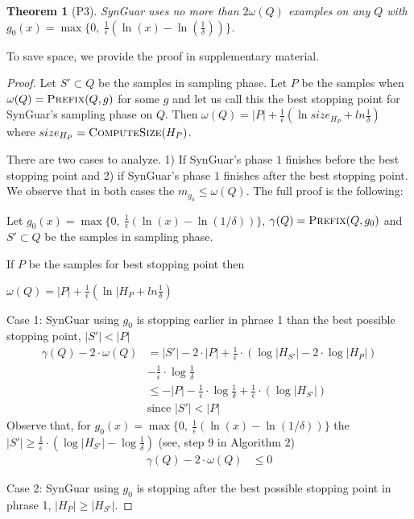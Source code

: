 \documentclass[11pt]{extarticle}
\newtheorem{theorem}{Theorem}[section]
\newcommand{\tool}{{\sc SynGuar}\xspace}
\newcommand{\parf}{g}
\begin{document}
\begin{theorem}[P3]
\label{thm:p3}
    \tool uses no more than $2\omega(Q)$ examples on any $Q$ with $\parf_{0}(x)=\max\{0, ~\frac{1}{\epsilon}(\ln(x)-\ln(\frac{1}{\delta}))\}$.
\end{theorem}
To save space, we provide the proof in supplementary material.
\begin{proof}
Let $S'\subset Q$ be the samples in sampling phase. Let $P$ be the samples when $\omega(Q)=\Call{Prefix}{Q,g}$ for some $g$ and let us call this the best stopping point for \tool's sampling phase on $Q$. Then $\omega(Q)=|P|+\frac{1}{\epsilon}(\ln{size_{H_{P}}} + ln{\frac{1}{\delta}})$ where $size_{H_{P}}= \Call{ComputeSize}{H_{P}}$.

There are two cases to analyze. 1) If \tool's phase $1$ finishes before the best stopping point and 2) if \tool's phase $1$ finishes after the best stopping point. We observe that in both cases the $m_{g_0}\le\omega(Q)$. 
The full proof is the following:

Let $\parf_0(x)=\max\{0, ~\frac{1}{\epsilon}(\ln(x)-\ln(1/\delta))\}$, $\gamma(Q) = \Call{Prefix}{Q,\parf_0}$ and $S'\subset Q$ be the samples in sampling phase.

If $P$ be the samples for best stopping point then

$\omega(Q)=|P|+\frac{1}{\epsilon}(\ln{|H_P} + ln{\frac{1}{\delta}})$

\noindent Case 1: \tool using $\parf_0$ is stopping earlier in phrase 1 than the best possible stopping point, $|S'| < |P|$
\begin{align*}
    \gamma(Q) - 2\cdot\omega(Q) &= |S'|- 2\cdot|P| +  \frac{1}{\epsilon}\cdot(\log{|H_{S'}|} - 2\cdot \log{|H_{P}|})\\ 
    &- \frac{1}{\epsilon}\cdot\log{\frac{1}{\delta}}\\
    & \leq -|P| - \frac{1}{\epsilon}\cdot\log{\frac{1}{\delta}} + \frac{1}{\epsilon}\cdot(\log{|H_{S'}|})\\
    &\text{since }|S'| < |P|
\end{align*}
Observe that, for $\parf_0(x)=\max\{0, ~\frac{1}{\epsilon}(\ln(x)-\ln(1/\delta))\} $ the 
$|S'| \geq \frac{1}{\epsilon}\cdot(\log{|H_{S'}|}-\log{\frac{1}{\delta}})$ (see, step $9$ in Algorithm $2$)
\begin{align*}
    \gamma(Q) - 2\cdot\omega(Q) &\leq 0
\end{align*}

\noindent Case 2: \tool using $\parf_0$ is stopping after the best possible stopping point in phrase 1, $|H_{P}|\ge|H_{S'}|$.


\end{proof}
\end{document}
